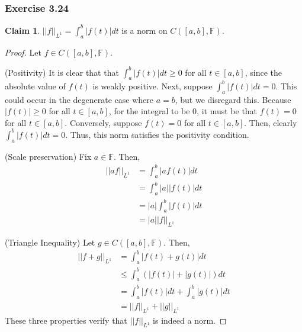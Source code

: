 \documentclass[letterpaper,12pt]{article}
\theoremstyle{definition}
\newtheorem{claim}[theorem]{Claim}
\begin{document}
\subsubsection*{Exercise 3.24}
\begin{claim}\label{241}
	$||f||_{L^1} = \int_a^b |f(t)| dt$ is a norm on $C([a,b],\mathbb{F})$.
\end{claim}
\begin{proof}
	Let $f \in C([a,b],\mathbb{F})$.
	
	(Positivity) It is clear that that $\int_a^b |f(t)| dt \geq 0$ for all $t \in [a,b]$, since the absolute value of $f(t)$ is weakly positive. Next, suppose $\int_a^b |f(t)| dt = 0$. This could occur in the degenerate case where $a=b$, but we disregard this. Because $|f(t)| \geq 0$ for all $t \in [a,b]$, for the integral to be 0, it must be that $f(t) = 0$ for all $t \in [a,b]$. Conversely, suppose $f(t) = 0$ for all $t \in [a,b]$. Then, clearly $\int_a^b |f(t)| dt = 0$. Thus, this norm satisfies the positivity condition. 
	
	(Scale preservation) Fix $a \in \mathbb{F}$. Then,
	\begin{align*}
	||af||_{L^1} &= \int_a^b |af(t)| dt \\
					&= \int_a^b |a| |f(t)| dt \\
					&= |a| \int_a^b |f(t)| dt \\
					&= |a| |f||_{L^1} 
	\end{align*}
	
	(Triangle Inequality) Let $g \in C([a,b],\mathbb{F})$. Then,
	\begin{align*}
	||f + g||_{L^1} &= \int_a^b |f(t) + g(t)| dt \\
						&\leq \int_a^b \left( |f(t)| + |g(t)|\right)dt \\
						&= \int_a^b |f(t)| dt + \int_a^b |g(t)| dt \\
						&= ||f||_{L^1} + ||g||_{L^1}
	\end{align*}
	These three properties verify that $||f||_{L^1}$ is indeed a norm.
\end{proof}
\end{document}

